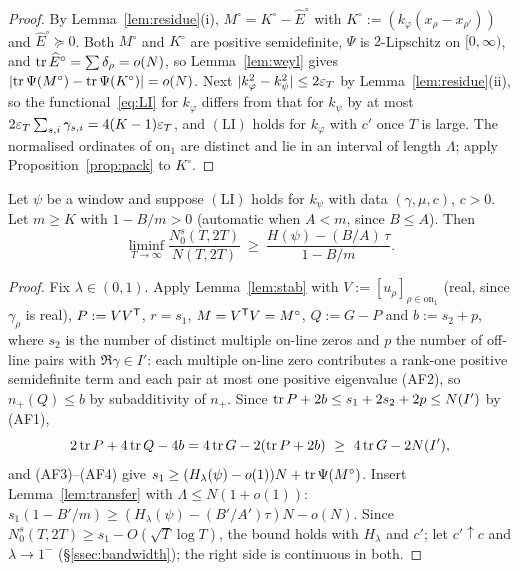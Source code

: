 \begin{proof}
By Lemma~\ref{lem:residue}(i), $M^\circ=K^\circ-\widehat E^\circ$ with $K^\circ:=(k_\varphi(x_\rho-x_{\rho'}))$ and $\widehat E^\circ\succeq0$. Both
$M^\circ$ and $K^\circ$ are positive semidefinite, $\Psi$ is $2$-Lipschitz on $[0,\infty)$, and $\operatorname{tr}\widehat E^\circ=\sum\delta_\rho=o(N)$, so
Lemma~\ref{lem:weyl} gives $\lvert \operatorname{tr}\Psi(M^\circ)-\operatorname{tr}\Psi(K^\circ)\rvert=o(N)$. Next $\lvert k_\varphi^2-k_\psi^2\rvert\le2\varepsilon_T$ by
Lemma~\ref{lem:residue}(ii), so the functional~\eqref{eq:LI} for $k_\varphi$ differs from that for $k_\psi$ by at most
$2\varepsilon_T\sum_{s,i}\gamma_{s,i}=4(K-1)\varepsilon_T$, and $(\mathrm{LI})$ holds for $k_\varphi$ with $c'$ once $T$ is large. The normalised ordinates of
$\mathrm{on}_1$ are distinct and lie in an interval of length $\Lambda$; apply Proposition~\ref{prop:pack} to $K^\circ$.
\end{proof}

\begin{theorem}\label{thm:G}
Let $\psi$ be a window and suppose $(\mathrm{LI})$ holds for $k_\psi$ with data $(\gamma,\mu,c)$, $c>0$. Let $m\ge K$ with $1-B/m>0$
\textup{(}automatic when $A<m$, since $B\le A$\textup{)}. Then
\[
\liminf_{T\to\infty}\frac{N_0^s(T,2T)}{N(T,2T)}\ \ge\ \frac{H(\psi)-(B/A)\,\tau}{1-B/m}.
\]
\end{theorem}

\begin{proof}
Fix $\lambda\in(0,1)$. Apply Lemma~\ref{lem:stab} with $V:=[u_\rho]_{\rho\in\mathrm{on}_1}$ (real, since $\gamma_\rho$ is real), $P:=VV^{\mathsf T}$,
$r=s_1$, $M=V^{\mathsf T}V=M^\circ$, $Q:=G-P$ and $b:=s_2+p$, where $s_2$ is the number of distinct multiple on-line zeros and $p$ the number of
off-line pairs with $\Re\gamma\in I'$: each multiple on-line zero contributes a rank-one positive semidefinite term and each pair at most one
positive eigenvalue (AF2), so $n_+(Q)\le b$ by subadditivity of $n_+$. Since $\operatorname{tr} P+2b\le s_1+2s_2+2p\le N(I')$ by (AF1),
\[
2\operatorname{tr} P+4\operatorname{tr} Q-4b=4\operatorname{tr} G-2(\operatorname{tr} P+2b)\ \ge\ 4\operatorname{tr} G-2N(I'),
\]
and (AF3)--(AF4) give $s_1\ge(H_\lambda(\psi)-o(1))N+\operatorname{tr}\Psi(M^\circ)$. Insert Lemma~\ref{lem:transfer} with $\Lambda\le N(1+o(1))$:
$s_1(1-B'/m)\ge(H_\lambda(\psi)-(B'/A')\tau)N-o(N)$. Since $N_0^s(T,2T)\ge s_1-O(\sqrt T\log T)$, the bound holds with $H_\lambda$ and $c'$; let
$c'\uparrow c$ and $\lambda\to1^-$ (\S\ref{ssec:bandwidth}); the right side is continuous in both.
\end{proof}

